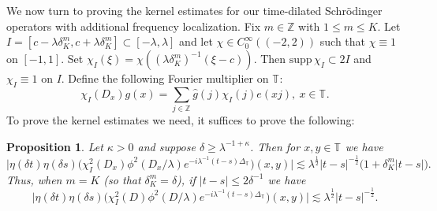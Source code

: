 \documentclass[11pt]{amsart}
\numberwithin{equation}{section}
\newcommand{\la}{\lambda}
\newcommand{\supp}[1]{\text{supp}\, #1}
\newcommand{\Z}[1][]{\mathbb{Z}^#1}
\newcommand{\T}[1][]{\mathbb{T}^#1}
\newcommand{\laplac}[1]{\Delta_{#1}}
\newcommand{\dK}[1]{\delta_{K}^{#1}}
\newtheorem{proposition}{Proposition}[section]
\begin{document}
We now turn to proving the kernel estimates for our time-dilated Schr\"{o}dinger operators with additional frequency localization. Fix $m \in \mathbb{Z}$ with $1 \leq m \leq K$. Let $I = [c - \la \dK{m}, c + \la \dK{m}] \subset [-\la, \la]$ and let $\chi \in C_{0}^{\infty}((-2,2))$ such that $\chi \equiv 1$ on $[-1,1]$. Set $\chi_{I}(\xi) =\chi((\la \dK{m})^{-1}(\xi - c))$. Then $\supp\chi_{I} \subset 2I$ and $\chi_{I} \equiv 1$ on $I$. Define the following Fourier multiplier on $\T{}$:
\begin{equation}
    \chi_{I}(D_x)g(x) = \sum_{j \in \Z{}}\widehat{g}(j)\chi_{I}(j)e(x j), \ x \in \T{}.
\end{equation}
To prove the kernel estimates we need, it suffices to prove the following:

\begin{proposition}
Let $\kappa > 0$ and suppose $\delta \geq \la^{-1 + \kappa}$. Then for $x,y \in \T{}$ we have
\begin{equation} 
     \big|\eta(\delta t)\eta(\delta s)\big( \chi_{I}^{2}(D_x)\phi^2(D_x / \la)e^{-i\la^{-1}(t-s)\laplac{\T{}}} \big)(x,y)\big| \lesssim \la^{\frac{1}{2}}|t-s|^{-\frac{1}{2}}\big(1 + \dK{m}|t-s|\big).
\end{equation} 
Thus, when $m = K$ (so that $\dK{m} = \delta$), if $|t-s| \leq 2\delta^{-1}$ we have 
\begin{equation}
    \big|\eta(\delta t)\eta(\delta s)\big( \chi_{I}^{2}(D)\phi^2(D / \la)e^{-i\la^{-1}(t-s)\laplac{\T{}}} \big)(x,y) \big| \lesssim \la^{\frac{1}{2}}|t-s|^{-\frac{1}{2}}.
\end{equation}
\end{proposition}
\end{document}
